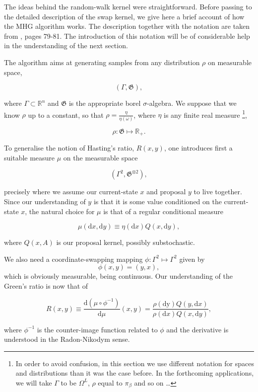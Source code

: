 The ideas behind the random-walk kernel were straightforward. Before passing to the detailed description of the swap kernel, we give here a brief account of how the MHG algorithm works. The description together with the notation are taken from \cite{CharlesJ.Geyer}, pages 79-81. The introduction of this notation will be of considerable help in the understanding of the next section. 

The algorithm aims at generating samples from any distribution $\rho$ on measurable space,

	$$(\Gamma, \mathfrak{G}),$$

where $\Gamma \subset \mathbb{R}^n$ and $\mathfrak{G}$ is the appropriate borel $\sigma$-algebra. We suppose that we know $\rho$ up to a constant, so that $\rho = \frac{\eta}{\eta(\omega)}$, where $\eta$ is any finite real measure \footnote{In order to avoid confusion, in this section we use different notation for spaces and distributions than it was the case before. In the forthcoming applications, we will take $\Gamma$ to be $\Omega^L$, $\rho$ equal to $\pi_\beta$ and so on \dots}, 

	$$\rho: \mathfrak{G} \mapsto \mathbb{R}_{+}.$$  

To generalise the notion of Hasting's ratio, $R(x,y)$, one introduces first a suitable measure $\mu$ on the measurable space 

	$$(\Gamma^2, \mathfrak{G}^{\otimes 2}),$$ 

precisely where we assume our current-state $x$ and proposal $y$ to live together. Since our understanding of $y$ is that it is some value conditioned on the current-state $x$, the natural choice for $\mu$ is that of a regular conditional measure

	$$\mu(\mathrm{d }x, \mathrm{d }y)   \equiv \eta (\mathrm{d} x) Q(x, \mathrm{d } y),$$

where $Q(x,A)$ is our proposal kernel, possibly substochastic.
 
 
We also need a coordinate-swapping mapping $\phi: \Gamma^2 \mapsto \Gamma^2$ given by $$\phi(x,y) = (y,x),$$ which is obviously measurable, being continuous. Our understanding of the Green's ratio is now that of

	$$R(x,y) \equiv	\frac{\mathrm{d }(\mu \circ \phi^{-1})}{\mathrm{d }\mu} (x,y) = \frac{\rho(\mathrm{d y} )Q(y, \mathrm{d }x)}{\rho(\mathrm{d }x) Q(x, \mathrm{d }y)},$$

where $\phi^{-1}$ is the counter-image function related to $\phi$ and the derivative is understood in the Radon-Nikodym sense. 

